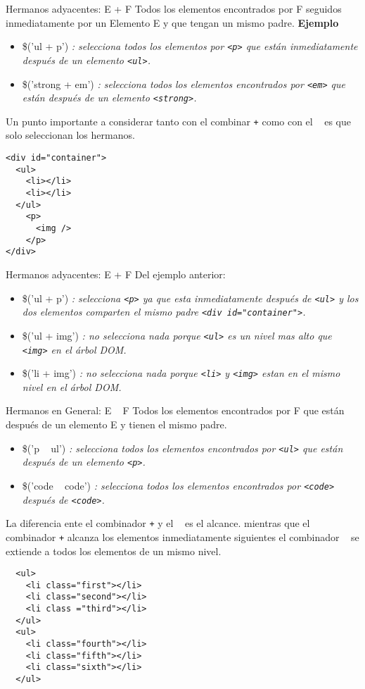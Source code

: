\begin{frame}[fragile]{Hermanos adyacentes: E + F} %
Todos los elementos encontrados por F seguidos inmediatamente por un Elemento E
y que tengan un mismo padre.
\textbf{Ejemplo}
\begin{itemize}
    \item \$('ul + p') \textit{: selecciona todos los elementos por
    \texttt{<p>} que están inmediatamente después de un elemento \texttt{<ul>}.}
    \item \$('strong + em') \textit{: selecciona todos los elementos
    encontrados por \texttt{<em>} que están después de un elemento
    \texttt{<strong>}.}
\end{itemize}
Un punto importante a considerar tanto con el combinar \texttt{+} como con el
\texttt{~} es que solo seleccionan los hermanos.
\begin{lstlisting}
<div id="container">
  <ul>
    <li></li>
    <li></li>
  </ul>
    <p>
      <img />
    </p>
</div>
\end{lstlisting}
\end{frame}

\begin{frame}[fragile]{Hermanos adyacentes: E + F} %
Del ejemplo anterior:
\begin{itemize}
    \item \$('ul + p') \textit{: selecciona \texttt{<p>} ya que esta
    inmediatamente después de \texttt{<ul>} y los dos elementos comparten el
    mismo padre \texttt{<div id="\/container"\/>}.}
    \item \$('ul + img') \textit{: no selecciona nada porque \texttt{<ul>} es
    un nivel mas alto que \texttt{<img>} en el árbol DOM.}
    \item \$('li + img') \textit{: no selecciona nada porque \texttt{<li>} y
    \texttt{<img>} estan en el mismo nivel en el árbol DOM.}
\end{itemize}
\end{frame}

\begin{frame}[fragile]{Hermanos en General: E ~ F} %
Todos los elementos encontrados por F que están después de un elemento E y
tienen el mismo padre.
\begin{itemize}
    \item \$('p ~ ul') \textit{: selecciona todos los elementos encontrados por
    \texttt{<ul>} que están después de un elemento \texttt{<p>}.}
    \item \$('code ~ code') \textit{: selecciona todos los elementos encontrados
    por \texttt{<code>} después de \texttt{<code>}.}
\end{itemize}
La diferencia ente el combinador \texttt{+} y el \texttt{~} es el alcance.
mientras que el combinador \texttt{+} alcanza los elementos inmediatamente
siguientes el combinador \texttt{~} se extiende a todos los elementos de un
mismo nivel.
\begin{lstlisting}
  <ul>
    <li class="first"></li>
    <li class="second"></li>
    <li class ="third"></li>
  </ul>
  <ul>
    <li class="fourth"></li>
    <li class="fifth"></li>
    <li class="sixth"></li>
  </ul>
\end{lstlisting}
\end{frame}

